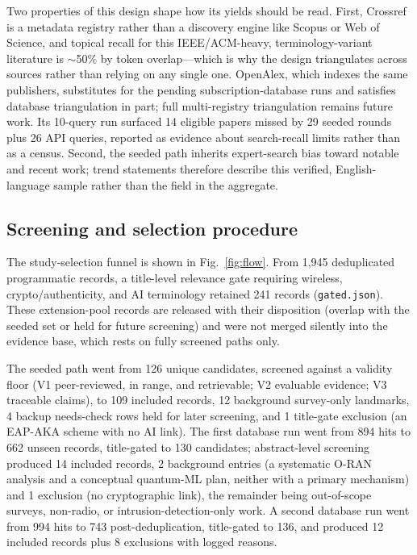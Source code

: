 \documentclass[10.5pt,compsoc,winfonts]{ICN}
\begin{document}
Two properties of this design shape how its yields should be read. First, Crossref is a metadata registry rather than a discovery engine like Scopus or Web of Science, and topical recall for this IEEE/ACM-heavy, terminology-variant literature is $\sim$50\% by token overlap—which is why the design triangulates across sources rather than relying on any single one. OpenAlex, which indexes the same publishers, substitutes for the pending subscription-database runs and satisfies database triangulation in part; full multi-registry triangulation remains future work. Its 10-query run surfaced 14 eligible papers missed by 29 seeded rounds plus 26 API queries, reported as evidence about search-recall limits rather than as a census. Second, the seeded path inherits expert-search bias toward notable and recent work; trend statements therefore describe this verified, English-language sample rather than the field in the aggregate.

\subsection{Screening and selection procedure}
The study-selection funnel is shown in Fig.~\ref{fig:flow}. From 1,945 deduplicated programmatic records, a title-level relevance gate requiring wireless, crypto/authenticity, and AI terminology retained 241 records (\texttt{gated.json}). These extension-pool records are released with their disposition (overlap with the seeded set or held for future screening) and were not merged silently into the evidence base, which rests on fully screened paths only.

The seeded path went from 126 unique candidates, screened against a validity floor (V1 peer-reviewed, in range, and retrievable; V2 evaluable evidence; V3 traceable claims), to 109 included records, 12 background survey-only landmarks, 4 backup needs-check rows held for later screening, and 1 title-gate exclusion (an EAP-AKA scheme with no AI link). The first database run went from 894 hits to 662 unseen records, title-gated to 130 candidates; abstract-level screening produced 14 included records, 2 background entries (a systematic O-RAN analysis and a conceptual quantum-ML plan, neither with a primary mechanism) and 1 exclusion (no cryptographic link), the remainder being out-of-scope surveys, non-radio, or intrusion-detection-only work. A second database run went from 994 hits to 743 post-deduplication, title-gated to 136, and produced 12 included records plus 8 exclusions with logged reasons.
\end{document}
